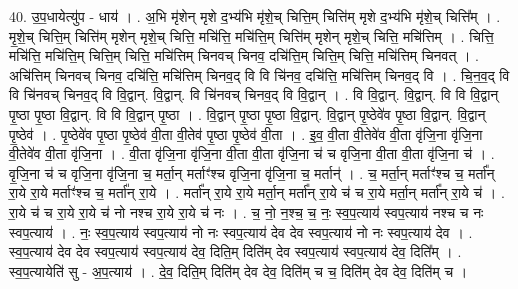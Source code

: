 \documentclass[17pt]{extarticle}
\begin{document}
40. उ॒प॒धायेत्यु॑प - धाय॑ । . अ॒भि मृ॑शेन् मृशे द॒भ्य॑भि मृ॑शे॒च् चित्ति॒म् चित्ति॑म् मृशे द॒भ्य॑भि मृ॑शे॒च् चित्ति᳚म् । . मृ॒शे॒च् चित्ति॒म् चित्ति॑म् मृशेन् मृशे॒च् चित्ति॒ मचि॑त्ति॒ मचि॑त्ति॒म् चित्ति॑म् मृशेन् मृशे॒च् चित्ति॒ मचि॑त्तिम् । . चित्ति॒ मचि॑त्ति॒ मचि॑त्ति॒म् चित्ति॒म् चित्ति॒ मचि॑त्तिम् चिनवच् चिनव॒ दचि॑त्ति॒म् चित्ति॒म् चित्ति॒ मचि॑त्तिम् चिनवत् । . अचि॑त्तिम् चिनवच् चिनव॒ दचि॑त्ति॒ मचि॑त्तिम् चिनव॒द् वि वि चि॑नव॒ दचि॑त्ति॒ मचि॑त्तिम् चिनव॒द् वि । . चि॒न॒व॒द् वि वि चि॑नवच् चिनव॒द् वि वि॒द्वान्. वि॒द्वान्. वि चि॑नवच् चिनव॒द् वि वि॒द्वान् । . वि वि॒द्वान्. वि॒द्वान्. वि वि वि॒द्वान् पृ॒ष्ठा पृ॒ष्ठा वि॒द्वान्. वि वि वि॒द्वान् पृ॒ष्ठा । . वि॒द्वान् पृ॒ष्ठा पृ॒ष्ठा वि॒द्वान्. वि॒द्वान् पृ॒ष्ठेवे॑व पृ॒ष्ठा वि॒द्वान्. वि॒द्वान् पृ॒ष्ठेव॑ । . पृ॒ष्ठेवे॑व पृ॒ष्ठा पृ॒ष्ठेव॑ वी॒ता वी॒तेव॑ पृ॒ष्ठा पृ॒ष्ठेव॑ वी॒ता । . इ॒व॒ वी॒ता वी॒तेवे॑व वी॒ता वृ॑जि॒ना वृ॑जि॒ना वी॒तेवे॑व वी॒ता वृ॑जि॒ना । . वी॒ता वृ॑जि॒ना वृ॑जि॒ना वी॒ता वी॒ता वृ॑जि॒ना च॑ च वृजि॒ना वी॒ता वी॒ता वृ॑जि॒ना च॑ । . वृ॒जि॒ना च॑ च वृजि॒ना वृ॑जि॒ना च॒ मर्ता॒न् मर्ताꣳ॑श्च वृजि॒ना वृ॑जि॒ना च॒ मर्तान्॑ । . च॒ मर्ता॒न् मर्ताꣳ॑श्च च॒ मर्ता᳚न् रा॒ये रा॒ये मर्ताꣳ॑श्च च॒ मर्ता᳚न् रा॒ये । . मर्ता᳚न् रा॒ये रा॒ये मर्ता॒न् मर्ता᳚न् रा॒ये च॑ च रा॒ये मर्ता॒न् मर्ता᳚न् रा॒ये च॑ । . रा॒ये च॑ च रा॒ये रा॒ये च॑ नो नश्च रा॒ये रा॒ये च॑ नः । . च॒ नो॒ न॒श्च॒ च॒ नः॒ स्व॒प॒त्याय॑ स्वप॒त्याय॑ नश्च च नः स्वप॒त्याय॑ । . नः॒ स्व॒प॒त्याय॑ स्वप॒त्याय॑ नो नः स्वप॒त्याय॑ देव देव स्वप॒त्याय॑ नो नः स्वप॒त्याय॑ देव । . स्व॒प॒त्याय॑ देव देव स्वप॒त्याय॑ स्वप॒त्याय॑ देव॒ दिति॒म् दिति॑म् देव स्वप॒त्याय॑ स्वप॒त्याय॑ देव॒ दिति᳚म् । . स्व॒प॒त्यायेति॑ सु - अ॒प॒त्याय॑ । . दे॒व॒ दिति॒म् दिति॑म् देव देव॒ दिति॑म् च च॒ दिति॑म् देव देव॒ दिति॑म् च । \newline
\end{document}
